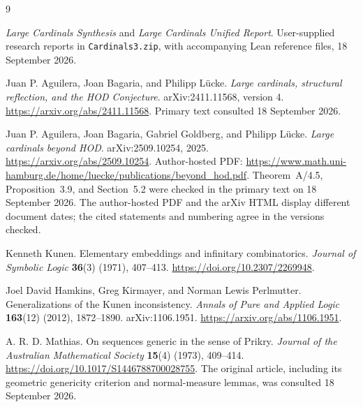 \documentclass[11pt,letterpaper]{article}
\theoremstyle{definition}
\begin{document}
\begin{thebibliography}{9}

\emph{Large Cardinals Synthesis} and \emph{Large Cardinals Unified Report}.
User-supplied research reports in \nolinkurl{Cardinals3.zip}, with accompanying Lean reference files, 18 September 2026.

Juan P. Aguilera, Joan Bagaria, and Philipp L\"ucke.
\emph{Large cardinals, structural reflection, and the HOD Conjecture}.
arXiv:2411.11568, version 4.
\url{https://arxiv.org/abs/2411.11568}.
Primary text consulted 18 September 2026.

Juan P. Aguilera, Joan Bagaria, Gabriel Goldberg, and Philipp L\"ucke.
\emph{Large cardinals beyond HOD}.
arXiv:2509.10254, 2025.
\url{https://arxiv.org/abs/2509.10254}.
Author-hosted PDF: \url{https://www.math.uni-hamburg.de/home/luecke/publications/beyond_hod.pdf}.
Theorem~A/4.5, Proposition~3.9, and Section~5.2 were checked in the primary text on 18 September 2026. The author-hosted PDF and the arXiv HTML display different document dates; the cited statements and numbering agree in the versions checked.

Kenneth Kunen.
Elementary embeddings and infinitary combinatorics.
\emph{Journal of Symbolic Logic} \textbf{36}(3) (1971), 407--413.
\url{https://doi.org/10.2307/2269948}.

Joel David Hamkins, Greg Kirmayer, and Norman Lewis Perlmutter.
Generalizations of the Kunen inconsistency.
\emph{Annals of Pure and Applied Logic} \textbf{163}(12) (2012), 1872--1890.
arXiv:1106.1951.
\url{https://arxiv.org/abs/1106.1951}.

A. R. D. Mathias.
On sequences generic in the sense of Prikry.
\emph{Journal of the Australian Mathematical Society} \textbf{15}(4) (1973), 409--414.
\url{https://doi.org/10.1017/S1446788700028755}.
The original article, including its geometric genericity criterion and normal-measure lemmas, was consulted 18 September 2026.

\end{thebibliography}
\end{document}
